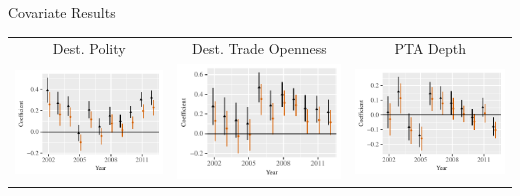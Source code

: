 \documentclass{beamer}
\begin{document}
\begin{frame}{Covariate Results}
\begin{tabular}{c@{\hskip -.4cm}c@{\hskip -.4cm}c}
\small{Dest. Polity} & \small{Dest. Trade Openness} & \small{PTA Depth} \\ 
\includegraphics[height=.3\textheight, clip=true, trim=.5cm .5cm 0cm .1cm]{slides_figures/rl_plots/DestPolity.pdf} 
 &
\includegraphics[height=.3\textheight, clip=true, trim=.5cm .5cm 0cm .1cm]{slides_figures/rl_plots/DestTO.pdf}   &
\includegraphics[height=.3\textheight, clip=true, trim=.5cm .5cm 0cm .1cm]{slides_figures/rl_plots/PTAdepth.pdf} \\  
\end{tabular}


\end{frame}
\end{document}

